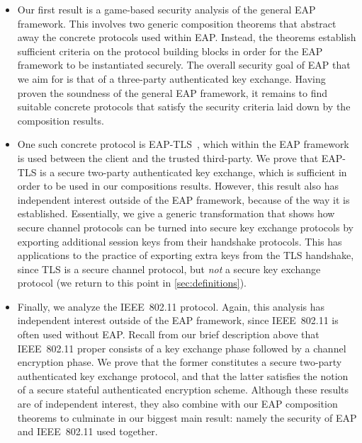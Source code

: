 \begin{itemize}

	\item 
	Our first result is a game-based security analysis of the general EAP framework.
	This involves two generic composition theorems that abstract away the concrete protocols used within EAP.
	Instead,
	the theorems establish sufficient criteria on the protocol building blocks in order for the EAP framework to be instantiated securely.
	The overall security goal of EAP that we aim for is that of a three-party authenticated key exchange.
	Having proven the soundness of the general EAP framework,
	it remains to find suitable concrete protocols that satisfy the security criteria laid down by the composition results. 
	
	\item 
	One such concrete protocol is EAP-TLS~\cite{IETF:RFC5216:EAP-TLS},
	which within the EAP framework is used between the  client and the trusted third-party.
	We prove that EAP-TLS is a secure two-party authenticated key exchange,
	which is sufficient in order to be used in our  compositions results. 
	However,
	this result also has independent interest outside of the EAP framework,
	because of the way it is established.
	Essentially,
	we give a generic transformation that shows how secure channel protocols can be turned into secure key exchange protocols by exporting additional session keys from their handshake protocols.
	This has applications to the practice of exporting extra keys from the TLS handshake,
	since TLS is a secure channel protocol,
	but \emph{not} a secure key exchange protocol
	(we return to this point in \cref{sec:definitions}).
	
	
	
	\item Finally,
	we analyze the IEEE~802.11 protocol.
	Again, this analysis has independent interest outside of the EAP framework,
	since IEEE~802.11 is often used without EAP.
	Recall from our brief description above that IEEE~802.11 proper consists of a key exchange phase followed by a channel encryption phase.
	We prove that the former constitutes a secure two-party authenticated key exchange protocol,
	and that the latter satisfies the notion of a secure stateful authenticated encryption scheme.  
	Although these results are of independent interest,
	they also combine with our EAP composition theorems to culminate in our biggest main result:
	namely the security of EAP and IEEE~802.11 used together.
	
\end{itemize}

